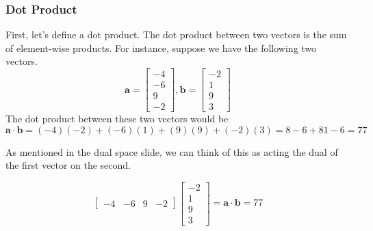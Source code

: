 \documentclass[10pt]{beamer}
\begin{document}
\begin{frame}
  \frametitle{Dot Product}
  First, let's define a dot product. The dot product between two vectors is the sum of element-wise products. For instance, suppose we have the following two vectors.
  $$\mathbf{a} = \left[\begin{matrix}
      -4\\
      -6\\
      9\\
      -2
    \end{matrix}\right], \mathbf{b} = \left[\begin{matrix}
      -2\\
      1\\
      9\\
      3
    \end{matrix}\right]$$
  The dot product between these two vectors would be
  $$\mathbf{a}\cdot\mathbf{b} = (-4)(-2) + (-6)(1) + (9)(9) + (-2)(3) = 8 - 6 + 81 - 6 = 77$$

  As mentioned in the dual space slide, we can think of this as acting the dual of the first vector on the second.

  $$\left[\begin{matrix}
      -4 & -6 & 9 & -2
    \end{matrix}\right] \left[\begin{matrix}
      -2\\
      1\\
      9\\
      3
    \end{matrix}\right] = \mathbf{a}\cdot\mathbf{b} = 77$$
\end{frame}
\end{document}
